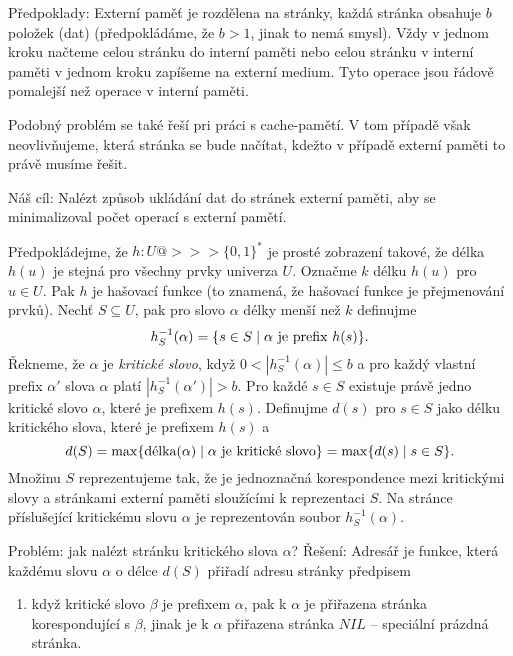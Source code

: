 \documentclass[a4paper,12pt]{article}
\begin{document}
Předpoklady:  Externí paměť je rozdělena na 
stránky, každá stránka obsahuje $b$ položek (dat) 
(předpokládáme, že $b>1$, jinak to nemá smysl).  Vždy v 
jednom kroku načteme celou stránku do interní paměti 
nebo celou stránku v interní paměti v jednom kroku 
zapíšeme na externí medium.  Tyto operace jsou řádově 
pomalejší než operace v interní paměti.  

Podobný problém se také řeší pri práci s cache-pamětí. V tom případě však 
neovlivňujeme, která stránka se bude načítat, kdežto v případě externí paměti to právě musíme řešit.

Náš cíl:  
Nalézt způsob ukládání dat do stránek externí 
paměti, aby se minimalizoval počet operací s externí 
pamětí.  

Předpokládejme, že $h:U@>>>\{0,1\}^{*}$ je prosté 
zobrazení takové, že délka $h(u)$ je stejná pro všechny prvky 
univerza $U$.  Označme $k$ délku $h(u)$ pro $u\in U$. Pak $
h$ je 
hašovací funkce (to znamená, že hašovací funkce je přejmenování prvků).  Nechť $S\subseteq U$, pak pro slovo $
\alpha$ délky 
menší než $k$ definujme 
$$h^{-1}_S(\alpha )=\{s\in S\mid\alpha\text{\rm\ je prefix }h(s)\}
.$$
Řekneme, že $\alpha$ je \emph{kritické} \emph{slovo}, když 
$0<|h^{-1}_S(\alpha )|\le b$ a pro každý vlastní prefix $
\alpha'$ slova $\alpha$ platí 
$|h^{-1}_S(\alpha')|>b$.  Pro každé $s\in S$ existuje právě jedno 
kritické slovo $\alpha$, které je prefixem $h(s)$.  Definujme $
d(s)$ 
pro $s\in S$ jako délku kritického slova, které je prefixem 
$h(s)$ a 
$$d(S)=\max\{\text{\rm délka}(\alpha )\mid\alpha\text{\rm\ je kritické slovo}
\}=\max\{d(s)\mid s\in S\}.$$
Množinu $S$ reprezentujeme tak, že je jednoznačná 
korespondence mezi kritickými slovy a stránkami externí 
paměti slouží\-cí\-mi k reprezentaci $S$.  Na stránce 
příslušející kritickému slovu $\alpha$ je reprezentován soubor 
$h^{-1}_S(\alpha )$.  

Problém: jak nalézt stránku kritického slova 
$\alpha$?\newline 
Řešení: Adresář je funkce, která každému slovu $
\alpha$ o 
délce $d(S)$ přiřadí adresu stránky předpisem
\begin{enumerate}
\item když kritické slovo $\beta$ je prefixem $\alpha$, pak k $
\alpha$ je 
přiřazena strán\-ka korespondující s $\beta$, jinak je k $
\alpha$ 
přiřazena strán\-ka $NIL$ -- speciální prázdná stránka.
\end{enumerate}
\end{document}
